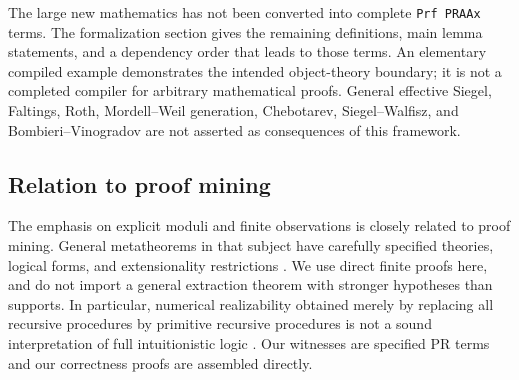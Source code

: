 The large new mathematics has not been converted into complete
\texttt{Prf PRAAx} terms.  The formalization section gives the remaining
definitions, main lemma statements, and a dependency order that leads to
those terms.  An elementary compiled example demonstrates the intended
object-theory boundary; it is not a completed compiler for arbitrary
mathematical proofs.  General effective Siegel, Faltings, Roth,
Mordell--Weil generation, Chebotarev, Siegel--Walfisz, and
Bombieri--Vinogradov are not asserted as consequences of this framework.

\subsection{Relation to proof mining}

The emphasis on explicit moduli and finite observations is closely related
to proof mining.  General metatheorems in that subject have carefully
specified theories, logical forms, and extensionality restrictions
\cite{Kohlenbach}.  We use direct finite proofs here, and do not import a
general extraction theorem with stronger hypotheses than \ipra supports.
In particular, numerical realizability obtained merely by replacing all
recursive procedures by primitive recursive procedures is not a sound
interpretation of full intuitionistic logic \cite{Plisko}.  Our witnesses
are specified PR terms and our correctness proofs are assembled directly.
